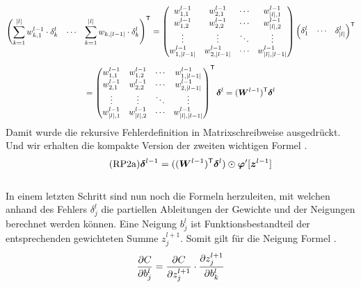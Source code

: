\begin{appendices}
\begin{gather*}
  \begin{pmatrix} \displaystyle\sum_{k=1}^{|l|} w_{k,1}^{l-1} \cdot \delta_k^l & \cdots & \displaystyle\sum_{k=1}^{|l|} w_{k,|l-1|} \cdot \delta_k^l \end{pmatrix}^{\mathsf{T}} =
  \begin{pmatrix}
    w_{1,1}^{l-1} & w_{2,1}^{l-1} & \cdots & w_{|l|,1}^{l-1} \\
    w_{1,2}^{l-1} & w_{2,2}^{l-1} & \cdots & w_{|l|,2}^{l-1} \\
    \vdots & \vdots & \ddots & \vdots \\
    w_{1,|l-1|}^{l-1} & w_{2,|l-1|}^{l-1} & \cdots & w_{|l|,|l-1|}^{l-1}
  \end{pmatrix}
  \begin{pmatrix} \delta_1^l & \cdots & \delta_{|l|}^l \end{pmatrix}^{\mathsf{T}} \\[5pt]=
  \begin{pmatrix}
      w_{1,1}^{l-1} & w_{1,2}^{l-1} & \cdots & w_{1,|l-1|}^{l-1} \\
      w_{2,1}^{l-1} & w_{2,2}^{l-1} & \cdots & w_{2,|l-1|}^{l-1} \\
      \vdots & \vdots & \ddots & \vdots \\
      w_{|l|,1}^{l-1} & w_{|l|,2}^{l-1} & \cdots & w_{|l|,|l-1|}^{l-1}
    \end{pmatrix}^{\mathsf{T}}
  \bm{\delta}^l = (\bm{W}^{l-1})^{\mathsf{T}} \bm{\delta}^l
\end{gather*}
\para{}
Damit wurde die rekursive Fehlerdefinition in Matrixschreibweise
ausgedrückt. Und wir erhalten die kompakte Version  der zweiten wichtigen Formel .
\\
\begin{equation}\tag{RP2a}\label{eq:RP2a}
  \bm{\delta}^{l-1} = ((\bm{W}^{l-1})^{\mathsf{T}} \bm{\delta}^l) \odot \bm{\varphi}'[\bm{z}^{l-1}]
\end{equation}
\\
In einem letzten Schritt sind nun noch die Formeln herzuleiten, mit welchen
anhand des Fehlers $\delta_j^l$ die partiellen Ableitungen der Gewichte und
der Neigungen berechnet werden können.
\para{}
Eine Neigung $b_j^l$ ist Funktionsbestandteil der entsprechenden gewichteten
Summe $z_j^{l+1}$. Somit gilt für die Neigung Formel .
\\
\begin{equation}\label{eq:RPh3}
  \partderiv{C}{b_j^l} = \partderiv{C}{z_j^{l+1}} \cdot \partderiv{z_j^{l+1}}{b_k^l}

\end{equation}
\end{appendices}

